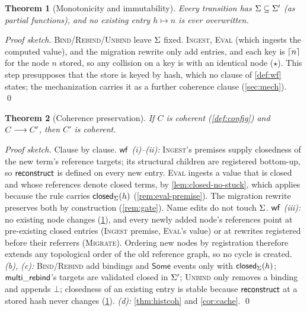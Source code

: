 \documentclass[11pt]{article}
\theoremstyle{definition}
\theoremstyle{plain}
\newtheorem{theorem}{Theorem}[section]
\theoremstyle{remark}
\begin{document}
\begin{theorem}[Monotonicity and immutability]\label{thm:mono}
Every transition has $\Sigma \subseteq \Sigma'$ (as partial functions), and no existing entry
$h \mapsto n$ is ever overwritten.
\end{theorem}
\begin{proof}[Proof sketch]
\textsc{Bind}/\textsc{Rebind}/\textsc{Unbind} leave $\Sigma$ fixed. \textsc{Ingest},
\textsc{Eval} (which ingests the computed value), and the migration rewrite only add entries,
and each key is $\lceil n \rceil$ for the node $n$ stored, so any collision on a key is with an
identical node ($\star$). This step presupposes that the store is keyed by hash, which no
clause of \cref{def:wf} states; the mechanization carries it as a further coherence clause
(\cref{sec:mech}). \qed
\end{proof}

\begin{theorem}[Coherence preservation]\label{thm:wf}
If $C$ is coherent (\cref{def:config}) and $C \longrightarrow C'$, then $C'$ is coherent.
\end{theorem}
\begin{proof}[Proof sketch]
Clause by clause. \emph{$\mathsf{wf}$ (i)--(ii):} \textsc{Ingest}'s premises supply closedness of the
new term's reference targets; its structural children are registered bottom-up, so
$\mathsf{reconstruct}$ is defined on every new entry. \textsc{Eval} ingests a value that is closed and
whose references denote closed terms, by \cref{lem:closed-no-stuck}, which applies because the
rule carries $\mathsf{closed}_{\Sigma}(h)$ (\cref{rem:eval-premise}). The
migration rewrite preserves both by construction (\cref{rem:gate}). Name edits do not touch
$\Sigma$.
\emph{$\mathsf{wf}$ (iii):} no existing node changes (\cref{thm:mono}), and every newly added node's
references point at pre-existing closed entries (\textsc{Ingest} premise, \textsc{Eval}'s
value) or at rewrites registered before their referrers (\textsc{Migrate}). Ordering new
nodes by registration therefore extends any topological order of the old reference graph, so
no cycle is created.
\emph{(b), (c):} \textsc{Bind}/\textsc{Rebind} add bindings and $\mathsf{Some}$ events only
with $\mathsf{closed}_{\Sigma}(h)$; $\mathsf{multi\_rebind}$'s targets are validated closed in $\Sigma'$;
\textsc{Unbind} only removes a binding and appends $\bot$; closedness of an existing entry is
stable because $\mathsf{reconstruct}$ at a stored hash never changes (\cref{thm:mono}). \emph{(d):}
\cref{thm:histcoh} and \cref{cor:cache}. \qed
\end{proof}
\end{document}
